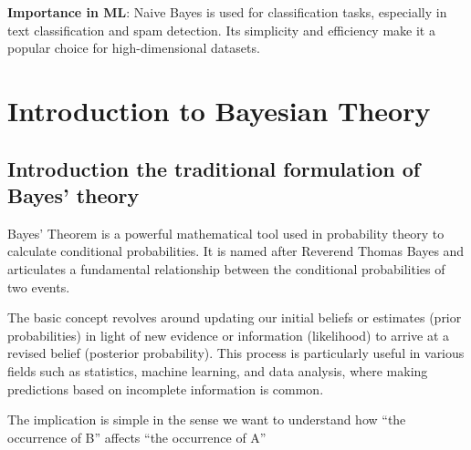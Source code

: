 \documentclass[
  12 pt,
  a4paper,
]{book}
\numberwithin{equation}{section}
\theoremstyle{plain}      %
\theoremstyle{definition} %
\theoremstyle{remark}     %
\theoremstyle{note}         %
\begin{document}
\textbf{Importance in ML}: Naive Bayes is used for classification tasks,
especially in text classification and spam detection. Its simplicity and
efficiency make it a popular choice for high-dimensional datasets.

\vspace*{\fill}

\newpage

\hypertarget{introduction-to-bayesian-theory}{%
\section{Introduction to Bayesian
Theory}\label{introduction-to-bayesian-theory}}

\hypertarget{introduction-the-traditional-formulation-of-bayes-theory}{%
\subsection{Introduction the traditional formulation of Bayes'
theory}\label{introduction-the-traditional-formulation-of-bayes-theory}}

Bayes' Theorem is a powerful mathematical tool used in probability
theory to calculate conditional probabilities. It is named after
Reverend Thomas Bayes and articulates a fundamental relationship between
the conditional probabilities of two events.

The basic concept revolves around updating our initial beliefs or
estimates (prior probabilities) in light of new evidence or information
(likelihood) to arrive at a revised belief (posterior probability). This
process is particularly useful in various fields such as statistics,
machine learning, and data analysis, where making predictions based on
incomplete information is common.

The implication is simple in the sense we want to understand how ``the
occurrence of B'' affects ``the occurrence of A''

\begin{figure}[htbp]
\centering
{}
\label{fig:B_to_A}
\end{figure}
\end{document}
